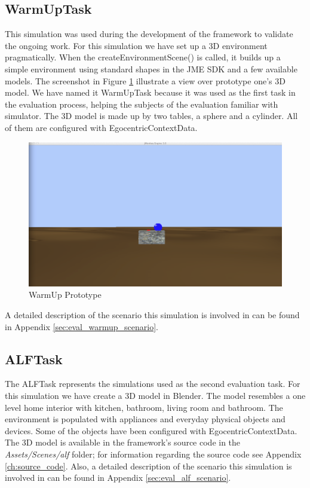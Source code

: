 \subsection{WarmUpTask} %
\label{subsec:impl_warmup_task}
This simulation was used during the development of the framework to validate the ongoing work. For this simulation we have set up a 3D environment pragmatically. When the createEnvironmentScene() is called, it builds up a simple environment using standard shapes in the JME SDK and a few available models. The screenshot in Figure \ref{fig:impl_prototype1} illustrate a view over prototype one's 3D model. We have named it WarmUpTask because it was used as the first task in the evaluation process, helping the subjects of the evaluation familiar with simulator. The 3D model is made up by two tables, a sphere and a cylinder. All of them are configured with EgocentricContextData.\\
\begin{figure}[H]
	\centering
	\includegraphics[width=0.8\linewidth]{gfx/Chapter4/prototype1}
	\caption{WarmUp Prototype}
	\label{fig:impl_prototype1}
\end{figure}

A detailed description of the scenario this simulation is involved in can be found in Appendix \ref{sec:eval_warmup_scenario}.

\subsection{ALFTask} %
\label{subsec:impl_alf_task}
The ALFTask represents the simulations used as the second evaluation task. For this simulation we have create a 3D model in Blender. The model resembles a one level home interior with kitchen, bathroom, living room and bathroom. The environment is populated with appliances and everyday physical objects and devices. Some of the objects have been configured with EgocentricContextData. The 3D model is available in the framework's source code in the \emph{Assets/Scenes/alf} folder; for information regarding the source code see Appendix \ref{ch:source_code}. Also, a detailed description of the scenario this simulation is involved in can be found in Appendix \ref{sec:eval_alf_scenario}.\\

